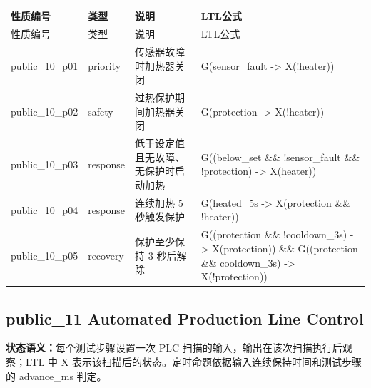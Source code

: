 \begin{longtable}{L{2.3cm}L{1.7cm}L{4.1cm}L{5.2cm}}

\toprule

性质编号 & 类型 & 说明 & LTL公式\\

\midrule

\endfirsthead

\toprule

性质编号 & 类型 & 说明 & LTL公式\\

\midrule

\endhead

{\ttfamily public\_10\_p01} & priority & 传感器故障时加热器关闭 & {\ttfamily G(sensor\_fault -> X(!heater))}\\

{\ttfamily public\_10\_p02} & safety & 过热保护期间加热器关闭 & {\ttfamily G(protection -> X(!heater))}\\

{\ttfamily public\_10\_p03} & response & 低于设定值且无故障、无保护时启动加热 & {\ttfamily G((below\_set \&\& !sensor\_fault \&\& !protection) -> X(heater))}\\

{\ttfamily public\_10\_p04} & response & 连续加热 5 秒触发保护 & {\ttfamily G(heated\_5s -> X(protection \&\& !heater))}\\

{\ttfamily public\_10\_p05} & recovery & 保护至少保持 3 秒后解除 & {\ttfamily G((protection \&\& !cooldown\_3s) -> X(protection)) \&\& G((protection \&\& cooldown\_3s) -> X(!protection))}\\

\bottomrule

\end{longtable}

\subsection{{\ttfamily public\_11} Automated Production Line Control}

\noindent\textbf{状态语义：}每个测试步骤设置一次 PLC 扫描的输入，输出在该次扫描执行后观察；LTL 中 X 表示该扫描后的状态。定时命题依据输入连续保持时间和测试步骤的 advance\_ms 判定。


